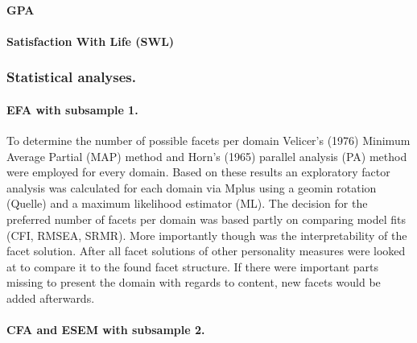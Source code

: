 \documentclass[man]{apa6}
\theoremstyle{definition}
\theoremstyle{definition}
\theoremstyle{definition}
\theoremstyle{remark}
\begin{document}
\hypertarget{gpa}{%
\paragraph{GPA}\label{gpa}}

\hypertarget{satisfaction-with-life-swl}{%
\paragraph{Satisfaction With Life
(SWL)}\label{satisfaction-with-life-swl}}

\hypertarget{statistical-analyses.}{%
\subsubsection{Statistical analyses.}\label{statistical-analyses.}}

\hypertarget{efa-with-subsample-1.}{%
\paragraph{EFA with subsample 1.}\label{efa-with-subsample-1.}}

To determine the number of possible facets per domain Velicer's (1976)
Minimum Average Partial (MAP) method and Horn's (1965) parallel analysis
(PA) method were employed for every domain. Based on these results an
exploratory factor analysis was calculated for each domain via Mplus
using a geomin rotation (Quelle) and a maximum likelihood estimator
(ML). The decision for the preferred number of facets per domain was
based partly on comparing model fits (CFI, RMSEA, SRMR). More
importantly though was the interpretability of the facet solution. After
all facet solutions of other personality measures were looked at to
compare it to the found facet structure. If there were important parts
missing to present the domain with regards to content, new facets would
be added afterwards.

\hypertarget{cfa-and-esem-with-subsample-2.}{%
\paragraph{CFA and ESEM with subsample
2.}\label{cfa-and-esem-with-subsample-2.}}
\end{document}
